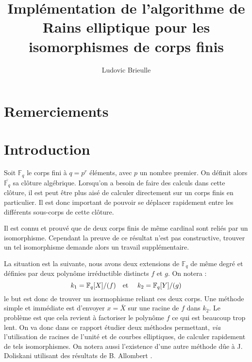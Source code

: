 \documentclass[a4paper]{article} %
\numberwithin{section}{part}
\numberwithin{equation}{section}
\newcommand\GF[1]{\mathbb{F}_{#1}}
\newcommand\etmath{\textup{\quad et \quad}}
\begin{document}
\title{Implémentation de l'algorithme de Rains elliptique pour les isomorphismes
de corps finis}
\author{Ludovic Brieulle}
\newtheorem{thm}{Thèorème}[section]
\newtheorem{lem}[thm]{Lemme}
\newtheorem{cor}{Corollaire}[thm]
\newtheorem{prop}[thm]{Proposition}
\theoremstyle{definition}
\newtheorem{defn}[thm]{Définition}
\newtheorem*{ex}{Exemple}
\theoremstyle{remark}
\newtheorem*{rem}{Remarque}

\maketitle
\part*{Remerciements}

\tableofcontents
\newpage

\part*{Introduction}
Soit $\GF{q}$ le corps fini à $q = p^r$ éléments, avec $p$ un nombre premier. On
définit alors $\overline{\GF{q}}$ sa clôture algébrique. Lorsqu'on a besoin de
faire des calculs dans cette clôture, il est peut être plus aisé de calculer
directement sur un corps finis en particulier. Il est donc important de pouvoir
se déplacer rapidement entre les différents sous-corps de cette clôture.\par
Il est connu et prouvé que de deux corps finis de même cardinal sont reliés par
un isomorphisme. Cependant la preuve de ce résultat n'est pas constructive,
trouver un tel isomorphisme demande alors un travail supplémentaire.\par
La situation est la suivante, nous avons deux extensions de $\GF{q}$ de même
degré et définies par deux polynôme irréductible distincts $f$ et $g$. On notera
:
\[k_1=\GF{q}[X]/(f)\etmath k_2=\GF{q}[Y]/(g)\]
le but est donc de trouver un isormophisme reliant ces deux corps. Une méthode
simple et immédiate est d'envoyer $x = \bar{X}$ sur une racine de $f$ dans
$k_2$. Le problème est que cela revient à factoriser le polynôme $f$ ce qui est
beaucoup trop lent.
On va donc dans ce rapport étudier deux méthodes permettant, \textit{via}
l'utilisation de racines de l'unité et de courbes elliptiques, de calculer
rapidement de tels isomorphismes. On notera aussi l'existence d'une autre
méthode dûe à J. Doliskani \cite{Dol} utilisant des résultats de B. Allombert
\cite{All}.
\end{document}

